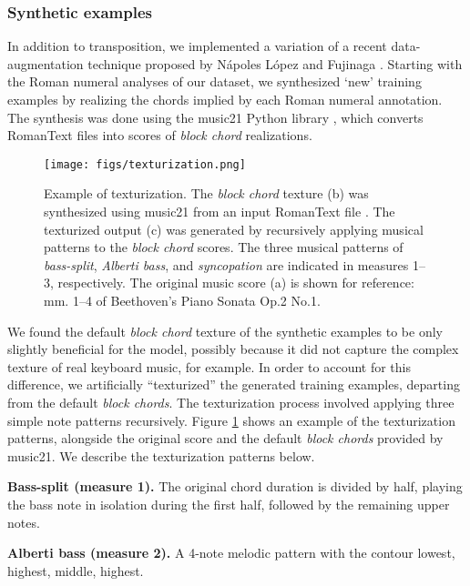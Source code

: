 \subsubsection{Synthetic examples}

In addition to transposition, we implemented a variation of a recent data-augmentation technique proposed by N\'apoles L\'opez and Fujinaga \cite{napoles_lopez_harmonic_2020}.
Starting with the Roman numeral analyses of our dataset, we synthesized `new' training examples by realizing the chords implied by each Roman numeral annotation.
The synthesis was done using the music21 Python library \cite{cuthbert_music21_2010}, which converts RomanText \cite{gotham_romantext_2019} files into scores of \emph{block chord} realizations.

\begin{figure}
 \centerline{
 \texttt{[image: figs/texturization.png]}}
 \caption{Example of texturization. The \emph{block chord} texture (b) was synthesized using music21 \cite{cuthbert_music21_2010} from an input RomanText file \cite{gotham_romantext_2019}. The texturized output (c) was generated by recursively applying musical patterns to the \emph{block chord} scores. The three musical patterns of \emph{bass-split}, \emph{Alberti bass}, and \emph{syncopation} are indicated in measures 1--3, respectively. The original music score (a) is shown for reference: mm. 1--4 of Beethoven's Piano Sonata Op.2 No.1.}
 \label{fig:texturization}
\end{figure}

We found the default \emph{block chord} texture of the synthetic examples to be only slightly beneficial for the model, possibly because it did not capture the complex texture of real keyboard music, for example.
In order to account for this difference, we artificially ``texturized'' the generated training examples, departing from the default \emph{block chords}.
The texturization process involved applying three simple note patterns recursively.
Figure \ref{fig:texturization} shows an example of the texturization patterns, alongside the original score and the default \emph{block chords} provided by music21. We describe the texturization patterns below.

\textbf{Bass-split (measure 1).} The original chord duration is divided by half, playing
the bass note in isolation during the first half, followed by the remaining upper notes.

\textbf{Alberti bass (measure 2).} A 4-note melodic pattern with the contour lowest, highest, middle, highest.

